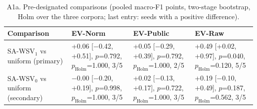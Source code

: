 \begin{table}[!htbp]\centering\scriptsize
\caption*{A1a. Pre-designated comparisons (pooled macro-F1 points, two-stage bootstrap, Holm over the three corpora; last entry: seeds with a positive difference).}
\begin{tabular}{>{\raggedright}p{2.3cm}>{\raggedright}p{4.25cm}>{\raggedright}p{4.25cm}>{\raggedright\arraybackslash}p{4.25cm}}\toprule
Comparison & EV-Norm & EV-Public & EV-Raw \\ \midrule
SA-WSV$_1$ vs uniform (primary) & +0.06 [$-$0.42, +0.51], $p$=0.792, $p_\mathrm{Holm}$=1.000, 3/5 & +0.05 [$-$0.29, +0.39], $p$=0.792, $p_\mathrm{Holm}$=1.000, 2/5 & +0.49 [+0.02, +0.97], $p$=0.040, $p_\mathrm{Holm}$=0.120, 5/5 \\
SA-WSV$_0$ vs uniform (secondary) & $-$0.00 [$-$0.20, +0.19], $p$=0.998, $p_\mathrm{Holm}$=1.000, 3/5 & +0.02 [$-$0.13, +0.17], $p$=0.722, $p_\mathrm{Holm}$=1.000, 3/5 & +0.19 [$-$0.10, +0.49], $p$=0.187, $p_\mathrm{Holm}$=0.562, 3/5 \\
\bottomrule\end{tabular}\end{table}

